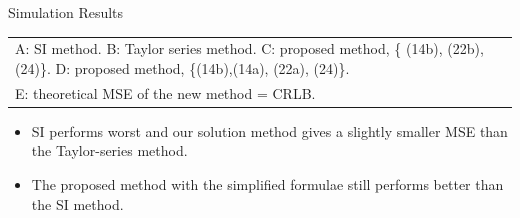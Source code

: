 \documentclass[10pt]{beamer}
\begin{document}
\begin{frame}{Simulation Results}
\begin{center}
\begin{tabular}{l c c c c c c c c}
  \multicolumn{9}{l}{\tiny A: SI method. B: Taylor series method. C: proposed method, \{ (14b), (22b), (24)\}. D: proposed method, \{(14b),(14a), (22a), (24)\}. }\\
  \multicolumn{9}{l}{\tiny E: theoretical MSE of the new method = CRLB.}
  \end{tabular}
  \end{center}
  \begin{itemize}
		\item \small SI performs worst and our solution method gives a slightly smaller MSE than the Taylor-series method.
		\item \small The proposed method with the simplified formulae still performs better than the SI method.
	\end{itemize}
\end{frame}
\end{document}

